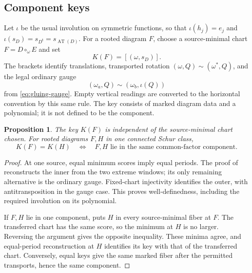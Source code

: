 \documentclass[11pt,a4paper]{amsart}
\numberwithin{equation}{section}
\theoremstyle{plain}
\newtheorem{proposition}[theorem]{Proposition}
\theoremstyle{definition}
\begin{document}
\subsection{Component keys}

Let \(\iota\) be the usual involution on symmetric functions, so that \(\iota(h_j)=e_j\) and \(\iota(s_D)=s_{D^{\mathsf t}}=s_{\operatorname{AT}(D)}\).  For a rooted diagram \(F\), choose a source-minimal chart \(F=D\circ_\omega E\) and set
\begin{equation}\label{eq:component-key}
 K(F)=[(\omega,s_D)].
\end{equation}
The brackets identify translations, transported rotation \((\omega,Q)\sim(\omega^*,Q)\), and the legal ordinary gauge
\[
 (\omega_a,Q)\sim(\omega_b,\iota(Q))
\]
from \eqref{eq:gluing-gauge}.  Empty vertical readings are converted to the horizontal convention by this same rule.  The key consists of marked diagram data and a polynomial; it is not defined to be the component.

\begin{proposition}\label{prop:component-key}
The key \(K(F)\) is independent of the source-minimal chart chosen.  For rooted diagrams \(F,H\) in one connected Schur class,
\[
 K(F)=K(H)\quad\Longleftrightarrow\quad
 F,H\text{ lie in the same common-factor component}.
\]
\end{proposition}
\begin{proof}
At one source, equal minimum scores imply equal periods.  The proof of  reconstructs the inner from the two extreme windows; its only remaining alternative is the ordinary gauge.  Fixed-chart injectivity identifies the outer, with antitransposition in the gauge case.  This proves well-definedness, including the required involution on its polynomial.

If \(F,H\) lie in one component,  puts \(H\) in every source-minimal fiber at \(F\).  The transferred chart has the same score, so the minimum at \(H\) is no larger.  Reversing the argument gives the opposite inequality.  These minima agree, and equal-period reconstruction at \(H\) identifies its key with that of the transferred chart.  Conversely, equal keys give the same marked fiber after the permitted transports, hence the same component.
\end{proof}
\end{document}

